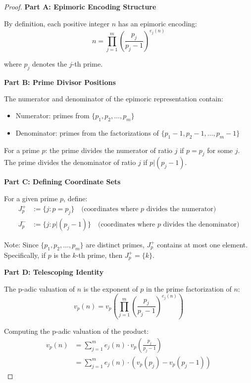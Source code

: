 \begin{proof}

\noindent \textbf{Part A: Epimoric Encoding Structure}

By definition, each positive integer $n$ has an epimoric encoding:
\begin{equation}
n = \prod_{j=1}^m \left(\frac{p_j}{p_j - 1}\right)^{e_j(n)}
\end{equation}

where $p_j$ denotes the $j$-th prime.

\noindent \textbf{Part B: Prime Divisor Positions}

The numerator and denominator of the epimoric representation contain:
\begin{itemize}
\item Numerator: primes from $\{p_1, p_2, \ldots, p_m\}$
\item Denominator: primes from the factorizations of $\{p_1-1, p_2-1, \ldots, p_m-1\}$
\end{itemize}

For a prime $p$: the prime divides the numerator of ratio $j$ if $p = p_j$ for some $j$. The prime divides the denominator of ratio $j$ if $p | (p_j - 1)$.

\noindent \textbf{Part C: Defining Coordinate Sets}

For a given prime $p$, define:
\begin{align}
J_p^+ &:= \{j : p = p_j\} \quad \text{(coordinates where } p \text{ divides the numerator)} \\
J_p^- &:= \{j : p | (p_j - 1)\} \quad \text{(coordinates where } p \text{ divides the denominator)}
\end{align}

Note: Since $\{p_1, p_2, \ldots, p_m\}$ are distinct primes, $J_p^+$ contains at most one element. Specifically, if $p$ is the $k$-th prime, then $J_p^+ = \{k\}$.

\noindent \textbf{Part D: Telescoping Identity}

The p-adic valuation of $n$ is the exponent of $p$ in the prime factorization of $n$:
\begin{equation}
v_p(n) = v_p\left(\prod_{j=1}^m \left(\frac{p_j}{p_j - 1}\right)^{e_j(n)}\right)
\end{equation}

Computing the p-adic valuation of the product:
\begin{align}
v_p(n) &= \sum_{j=1}^m e_j(n) \cdot v_p\left(\frac{p_j}{p_j - 1}\right) \\
&= \sum_{j=1}^m e_j(n) \cdot \left(v_p(p_j) - v_p(p_j - 1)\right)
\end{align}


\end{proof}
